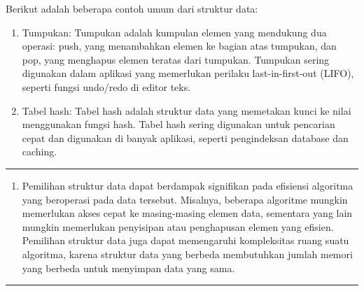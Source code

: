 \documentclass[12pt,preprintnumbers,amsmath,amssymb,nofootinbib,superscriptaddress]{revtex4-1}
\begin{document}
\vspace{2cm}
Berikut adalah beberapa contoh umum dari struktur data:
\begin{enumerate}
    \item Tumpukan: Tumpukan adalah kumpulan elemen yang mendukung dua operasi: push, yang menambahkan elemen ke bagian atas tumpukan, dan pop, yang menghapus elemen teratas dari tumpukan. Tumpukan sering digunakan dalam aplikasi yang memerlukan perilaku last-in-first-out (LIFO), seperti fungsi undo/redo di editor teks.
    \item Tabel hash: Tabel hash adalah struktur data yang memetakan kunci ke nilai menggunakan fungsi hash. Tabel hash sering digunakan untuk pencarian cepat dan digunakan di banyak aplikasi, seperti pengindeksan database dan caching.
\end{enumerate}

\vspace{1cm}

\newpage

\label{Ueff}
\vspace{-0.7cm}
\vspace{-0.2cm}\hrule

\vspace{2cm}

\begin{enumerate}
    \item Pemilihan struktur data dapat berdampak signifikan pada efisiensi algoritma yang beroperasi pada data tersebut. Misalnya, beberapa algoritme mungkin memerlukan akses cepat ke masing-masing elemen data, sementara yang lain mungkin memerlukan penyisipan atau penghapusan elemen yang efisien. Pemilihan struktur data juga dapat memengaruhi kompleksitas ruang suatu algoritma, karena struktur data yang berbeda membutuhkan jumlah memori yang berbeda untuk menyimpan data yang sama.
\end{enumerate}

\vspace{1cm}

\newpage

\vspace{-0.7cm}
\vspace{-0.2cm}
\hrule

\vspace{0.8cm}
\end{document}
